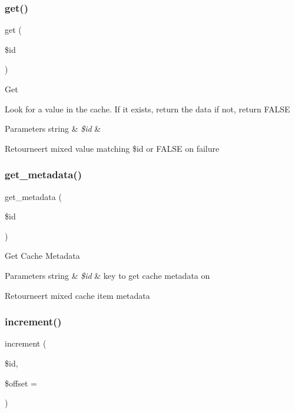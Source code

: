 \subsubsection{\texorpdfstring{get()}{get()}}
{\footnotesize\ttfamily get (\begin{DoxyParamCaption}\item[{}]{\$id }\end{DoxyParamCaption})}

Get

Look for a value in the cache. If it exists, return the data if not, return F\+A\+L\+SE


\begin{DoxyParams}[1]{Parameters}
string & {\em \$id} & \\
\hline
\end{DoxyParams}
\begin{DoxyReturn}{Retourneert}
mixed value matching \$id or F\+A\+L\+SE on failure 
\end{DoxyReturn}
\mbox{\label{class_c_i___cache_a59635cf18e997c5141bffa05ff7622e0}} 
\subsubsection{\texorpdfstring{get\_metadata()}{get\_metadata()}}
{\footnotesize\ttfamily get\+\_\+metadata (\begin{DoxyParamCaption}\item[{}]{\$id }\end{DoxyParamCaption})}

Get Cache Metadata


\begin{DoxyParams}[1]{Parameters}
string & {\em \$id} & key to get cache metadata on \\
\hline
\end{DoxyParams}
\begin{DoxyReturn}{Retourneert}
mixed cache item metadata 
\end{DoxyReturn}
\mbox{\label{class_c_i___cache_a2f07a4e09b57f4460d49852497d1808f}} 
\subsubsection{\texorpdfstring{increment()}{increment()}}
{\footnotesize\ttfamily increment (\begin{DoxyParamCaption}\item[{}]{\$id,  }\item[{}]{\$offset = {} }\end{DoxyParamCaption})}


